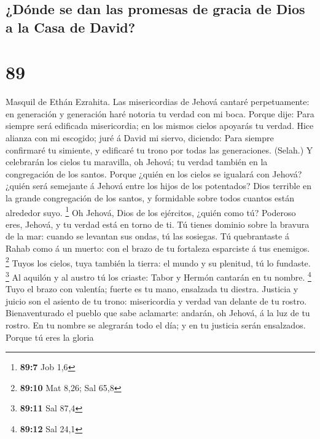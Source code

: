 \hypertarget{duxf3nde-se-dan-las-promesas-de-gracia-de-dios-a-la-casa-de-david}{%
\subsection{¿Dónde se dan las promesas de gracia de Dios a la Casa de
David?}\label{duxf3nde-se-dan-las-promesas-de-gracia-de-dios-a-la-casa-de-david}}

\hypertarget{section-88}{%
\section{89}\label{section-88}}

 Masquil de Ethán Ezrahita. Las misericordias de Jehová
cantaré perpetuamente: en generación y generación haré notoria tu verdad
con mi boca.  Porque dije: Para siempre será edificada
misericordia; en los mismos cielos apoyarás tu verdad.  Hice
alianza con mi escogido; juré á David mi siervo, diciendo: 
Para siempre confirmaré tu simiente, y edificaré tu trono por todas las
generaciones. (Selah.)  Y celebrarán los cielos tu
maravilla, oh Jehová; tu verdad también en la congregación de los
santos.  Porque ¿quién en los cielos se igualará con Jehová?
¿quién será semejante á Jehová entre los hijos de los potentados?
 Dios terrible en la grande congregación de los santos, y
formidable sobre todos cuantos están alrededor suyo. \footnote{\textbf{89:7}
  Job 1,6}  Oh Jehová, Dios de los ejércitos, ¿quién como
tú? Poderoso eres, Jehová, y tu verdad está en torno de ti. 
Tú tienes dominio sobre la bravura de la mar: cuando se levantan sus
ondas, tú las sosiegas.  Tú quebrantaste á Rahab como á un
muerto: con el brazo de tu fortaleza esparciste á tus enemigos.
\footnote{\textbf{89:10} Mat 8,26; Sal 65,8}  Tuyos los
cielos, tuya también la tierra: el mundo y su plenitud, tú lo fundaste.
\footnote{\textbf{89:11} Sal 87,4}  Al aquilón y al austro
tú los criaste: Tabor y Hermón cantarán en tu nombre. \footnote{\textbf{89:12}
  Sal 24,1}  Tuyo el brazo con valentía; fuerte es tu mano,
ensalzada tu diestra.  Justicia y juicio son el asiento de
tu trono: misericordia y verdad van delante de tu rostro. 
Bienaventurado el pueblo que sabe aclamarte: andarán, oh Jehová, á la
luz de tu rostro.  En tu nombre se alegrarán todo el día; y
en tu justicia serán ensalzados.  Porque tú eres la gloria
